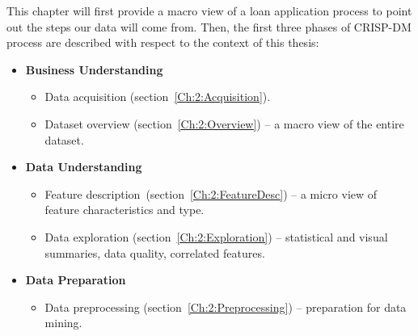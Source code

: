  
This chapter will first provide a macro view of a loan application process to point out the steps our data will come from. Then, the first three phases of CRISP-DM process are described with respect to the context of this thesis:
\begin{itemize}
    \item \textbf{Business Understanding }  
    \begin{itemize}
        \item Data acquisition (section~\ref{Ch:2:Acquisition}). 
        \item Dataset overview (section~\ref{Ch:2:Overview}) -- a macro view of the entire dataset.
    \end{itemize}
    \item \textbf{Data Understanding }
        \begin{itemize}
            \item Feature description~(section~\ref{Ch:2:FeatureDesc}) -- a micro view of feature characteristics and type.
            \item Data exploration (section~\ref{Ch:2:Exploration}) -- statistical and visual summaries, data quality, correlated features.
        \end{itemize}
    \item \textbf{Data Preparation }
            \begin{itemize}
                \item Data preprocessing (section~\ref{Ch:2:Preprocessing}) -- preparation for data mining.
        \end{itemize}
\end{itemize}

